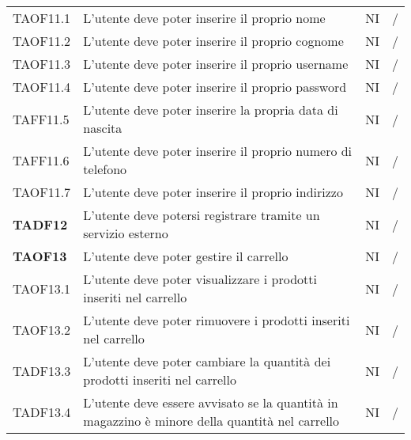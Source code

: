 \begin{center}
\begin{longtable}[!h]{p{60px} p{240px} p{35px} p{35px}}
        TAOF11.1        & L'utente deve poter inserire il proprio nome                                                        & NI             & /              \\
        TAOF11.2        & L'utente deve poter inserire il proprio cognome                                                     & NI             & /              \\
        TAOF11.3        & L'utente deve poter inserire il proprio username                                                    & NI             & /              \\
        TAOF11.4        & L'utente deve poter inserire il proprio password                                                    & NI             & /              \\
        TAFF11.5        & L'utente deve poter inserire la propria data di nascita                                             & NI             & /              \\
        TAFF11.6        & L'utente deve poter inserire il proprio numero di telefono                                          & NI             & /              \\
        TAOF11.7        & L'utente deve poter inserire il proprio indirizzo                                                   & NI             & /              \\
        \textbf{TADF12} & L'utente deve potersi registrare tramite un servizio esterno                                        & NI             & /              \\
        \textbf{TAOF13} & L'utente deve poter gestire il carrello                                                             & NI             & /              \\
        TAOF13.1        & L'utente deve poter visualizzare i prodotti inseriti nel carrello                                   & NI             & /              \\
        TAOF13.2        & L'utente deve poter rimuovere i prodotti inseriti nel carrello                                      & NI             & /              \\
        TADF13.3        & L'utente deve poter cambiare la quantità dei prodotti inseriti nel carrello                         & NI             & /              \\
        TADF13.4        & L'utente deve essere avvisato se la quantità in magazzino è minore della quantità nel carrello      & NI             & /              \\

\end{longtable}
\end{center}

